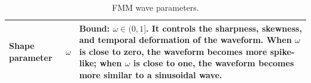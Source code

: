 \documentclass[a4paper]{article}
\begin{document}
\begin{table}[H]
\begin{tabular}{p{} p{} p{}}
         Shape parameter

         & $\omega$

         & Bound: $\omega \in (0, 1]$. It controls the sharpness, skewness, and temporal deformation of the waveform. When $\omega$ is close to zero, the waveform becomes more spike-like; when $\omega$ is close to one, the waveform becomes more similar to a sinusoidal wave. \\

         \hline

      \end{tabular}

      \caption{FMM wave parameters.}

      \label{tab:fmm-wave-parameters}

   \end{table}

   
   
\end{document}
